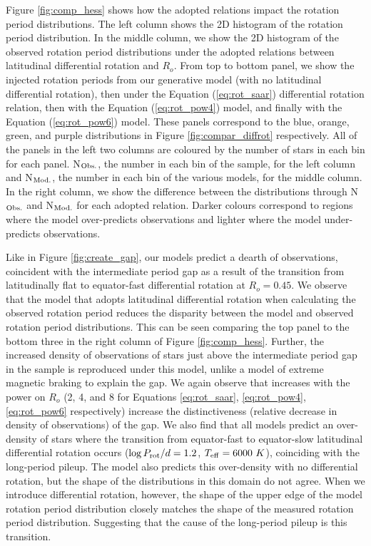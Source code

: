 Figure \ref{fig:comp_hess} shows how the adopted relations impact the rotation period distributions.
The left column shows the 2D histogram of the \citet{mcquillan_rotation_2014} rotation period distribution.
In the middle column, we show the 2D histogram of the observed rotation period distributions under the adopted relations between latitudinal differential rotation and $R_o$.
From top to bottom panel, we show the injected rotation periods from our generative model (with no latitudinal differential rotation), then under the \citet{saar_starspots_2011} Equation (\ref{eq:rot_saar}) differential rotation relation, then with the Equation (\ref{eq:rot_pow4}) model, and finally with the Equation (\ref{eq:rot_pow6}) model.
These panels correspond to the blue, orange, green, and purple distributions in Figure \ref{fig:compar_diffrot} respectively.
All of the panels in the left two columns are coloured by the number of stars in each bin for each panel.
N$_{\rm{Obs.}}$, the number in each bin of the \citet{mcquillan_rotation_2014} sample, for the left column and N$_{\rm{Mod.}}$, the number in each bin of the various models, for the middle column.
In the right column, we show the difference between the distributions through N$_{\rm{Obs.}}$ and N$_{\rm{Mod.}}$ for each adopted relation.
Darker colours correspond to regions where the model over-predicts observations and lighter where the model under-predicts observations.

Like in Figure \ref{fig:create_gap}, our models predict a dearth of observations, coincident with the intermediate period gap as a result of the transition from latitudinally flat to equator-fast differential rotation at $R_o = 0.45$.
We observe that the model that adopts latitudinal differential rotation when calculating the observed rotation period reduces the disparity between the model and observed rotation period distributions.
This can be seen comparing the top panel to the bottom three in the right column of Figure \ref{fig:comp_hess}.
Further, the increased density of observations of stars just above the intermediate period gap in the \kepler{} sample is reproduced under this model, unlike a model of extreme magnetic braking to explain the gap.
We again observe that increases with the power on $R_o$ (2, 4, and 8 for Equations \ref{eq:rot_saar}, \ref{eq:rot_pow4}, \ref{eq:rot_pow6} respectively) increase the distinctiveness (relative decrease in density of observations) of the gap.
We also find that all models predict an over-density of stars where the transition from equator-fast to equator-slow latitudinal differential rotation occurs ($\log P_{\rm{rot}}/d = 1.2$, $T_{\rm{eff}} = 6000 \ K$), coinciding with the long-period pileup.
The model also predicts this over-density with no differential rotation, but the shape of the distributions in this domain do not agree.
When we introduce differential rotation, however, the shape of the upper edge of the model rotation period distribution closely matches the shape of the measured rotation period distribution.
Suggesting that the cause of the long-period pileup is this transition.

